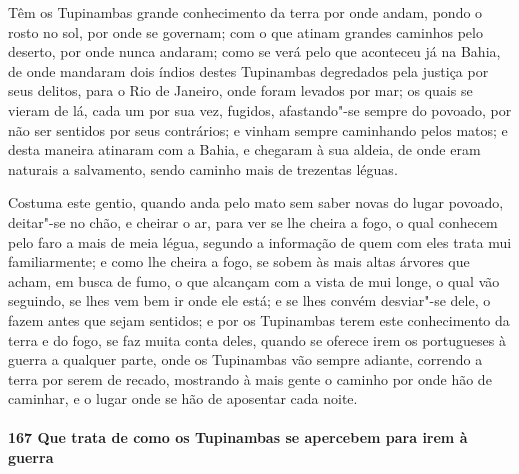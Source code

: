 Têm os Tupinambas grande conhecimento da terra por onde andam, pondo o rosto no sol, por
onde se governam; com o que atinam grandes caminhos pelo deserto, por onde nunca andaram;
como se verá pelo que aconteceu já na Bahia, de onde mandaram dois índios destes
Tupinambas degredados pela justiça por seus delitos, para o Rio de Janeiro, onde foram
levados por mar; os quais se vieram de lá, cada um por sua vez, fugidos, afastando"-se
sempre do povoado, por não ser sentidos por seus contrários; e vinham sempre caminhando
pelos matos; e desta maneira atinaram com a Bahia, e chegaram à sua aldeia, de onde eram
naturais a salvamento, sendo caminho mais de trezentas léguas.

Costuma este gentio, quando anda pelo mato sem saber novas do lugar povoado, deitar"-se no
chão, e cheirar o ar, para ver se lhe cheira a fogo, o qual conhecem pelo faro a mais de
meia légua, segundo a informação de quem com eles trata mui familiarmente; e como lhe
cheira a fogo, se sobem às mais altas árvores que acham, em busca de fumo, o que alcançam
com a vista de mui longe, o qual vão seguindo, se lhes vem bem ir onde ele está; e se lhes
convém desviar"-se dele, o fazem antes que sejam sentidos; e por os Tupinambas terem este
conhecimento da terra e do fogo, se faz muita conta deles, quando se oferece irem os
portugueses à guerra a qualquer parte, onde os Tupinambas vão sempre adiante, correndo a
terra por serem de recado, mostrando à mais gente o caminho por onde hão de caminhar, e o
lugar onde se hão de aposentar cada noite.

\paragraph{167 Que trata de como os Tupinambas se apercebem para irem à guerra}

